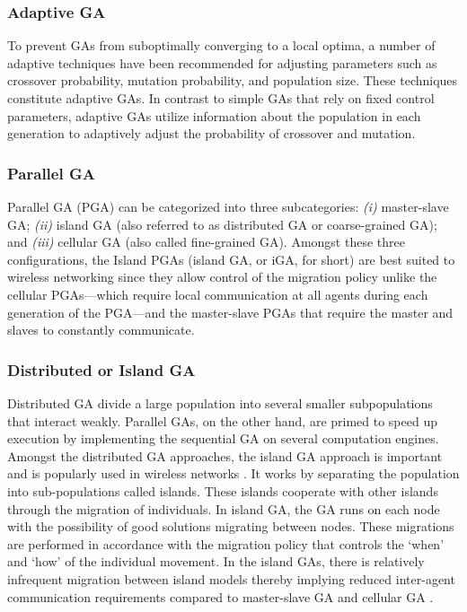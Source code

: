 \documentclass[journal]{IEEEtran}
\begin{document}
\vspace{2mm}
\subsubsection{Adaptive GA}

To prevent GAs from suboptimally converging to a local optima, a number of adaptive techniques have been recommended for adjusting parameters such as crossover probability, mutation probability, and population size. These techniques constitute adaptive GAs. In contrast to simple GAs that rely on fixed control parameters, adaptive GAs utilize information about the population in each generation to adaptively adjust the probability of crossover and mutation. 

\vspace{2mm}
\subsubsection{Parallel GA}

Parallel GA (PGA) can be categorized into three subcategories: \textit{(i)} master-slave GA; \textit{(ii)} island GA (also referred to as distributed GA or coarse-grained GA); and \textit{(iii)} cellular GA (also called fine-grained GA). Amongst these three configurations, the Island PGAs (island GA, or iGA, for short) are best suited to wireless networking since they allow control of the migration policy unlike the cellular PGAs---which require local communication at all agents during each generation of the PGA---and the master-slave PGAs that require the master and slaves to constantly communicate. 

\vspace{2mm}
\subsubsection{Distributed or Island GA}

Distributed GA divide a large population into several smaller subpopulations that interact weakly. Parallel GAs, on the other hand, are primed to speed up execution by implementing the sequential GA on several computation engines. Amongst the distributed GA approaches, the island GA approach is important and is popularly used in wireless networks \cite{friend2008architecture} \cite{elnainay2009channel}. It works by separating the population into sub-populations called islands. These islands cooperate with other islands through the migration of individuals. In island GA, the GA runs on each node with the possibility of good solutions migrating between nodes. These migrations are performed in accordance with the migration policy that controls the `when' and `how' of the individual movement. In the island GAs, there is relatively infrequent migration between island models thereby implying reduced inter-agent communication requirements compared to master-slave GA and cellular GA \cite{alba1999survey}.
\end{document}
